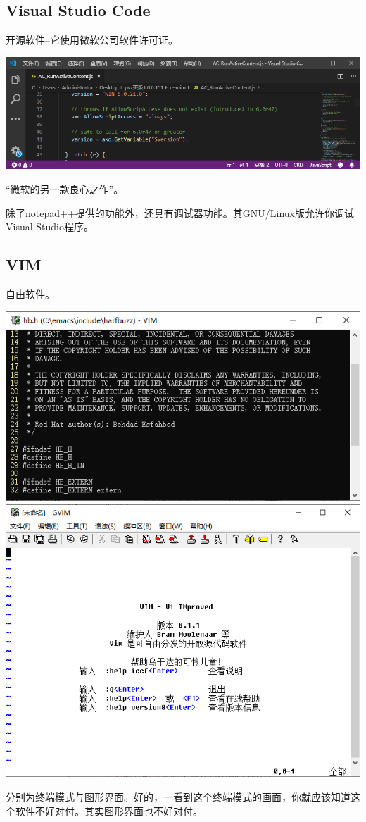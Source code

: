 \documentclass{book}
\begin{document}
\subsection{Visual Studio Code}
开源软件--它使用微软公司软件许可证。
\begin{center}
	\includegraphics[scale=0.7]{pic/vscode.PNG}
\end{center}
“微软的另一款良心之作”。\par
除了notepad++提供的功能外，还具有调试器功能。其GNU/Linux版允许你调试Visual Studio程序。
\subsection{VIM}
自由软件。
\begin{center}
	\includegraphics[scale=0.7]{pic/vim.png}\\    \includegraphics[scale=0.7]{pic/gvim.png}
\end{center}
分别为终端模式与图形界面。好的，一看到这个终端模式的画面，你就应该知道这个软件不好对付。其实图形界面也不好对付。
\end{document}
